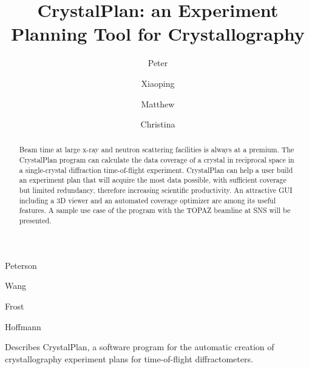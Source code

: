 \documentclass[final]{iucr}              %
\begin{document}


\title{CrystalPlan: an Experiment Planning Tool for Crystallography}



\author[a]{Peter}{Peterson}
\author[a]{Xiaoping}{Wang}
\author[a]{Matthew}{Frost}
\author[a]{Christina}{Hoffmann}







\maketitle                        %

\begin{synopsis}
Describes CrystalPlan, a software program for the automatic creation of 
crystallography experiment plans for time-of-flight diffractometers.
\end{synopsis}

\begin{abstract}
Beam time at large x-ray and neutron scattering facilities is always at a premium.
The CrystalPlan program can calculate the data coverage of a crystal in reciprocal
space in a single-crystal diffraction time-of-flight experiment. CrystalPlan can 
help a user build an experiment plan that will acquire the most data possible, 
with sufficient coverage but limited redundancy, therefore increasing scientific 
productivity. 
An attractive GUI including a 3D viewer and an automated coverage optimizer 
are among its useful features. 
A sample use case of the program with the TOPAZ beamline at SNS will be
presented. 
\end{abstract}
\end{document}

